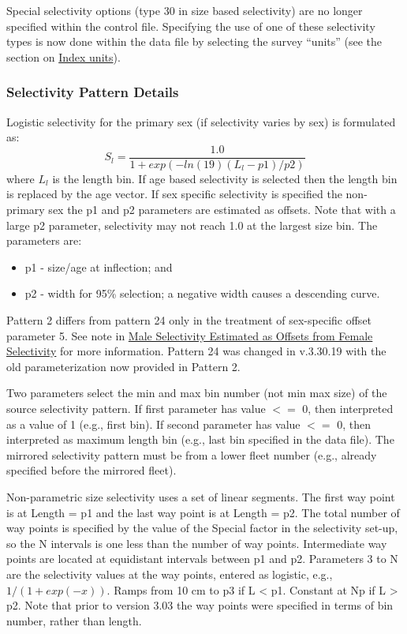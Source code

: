 Special selectivity options (type 30 in size based selectivity) are no longer specified within the control file. Specifying the use of one of these selectivity types is now done within the data file by selecting the survey ``units'' (see the section on \hyperlink{IndexUnits}{Index units}).

\subsubsection{Selectivity Pattern Details}
Logistic selectivity for the primary sex (if selectivity varies by sex) is formulated as:
	\begin{equation}
	S_l = \frac{1.0}{1+exp(-ln(19)(L_l - p1)/p2)}
	\end{equation}
where $L_l$ is the length bin. If age based selectivity is selected then the length bin is replaced by the age vector. If sex specific selectivity is specified the non-primary sex the p1 and p2 parameters are estimated as offsets. Note that with a large p2 parameter, selectivity may not reach 1.0 at the largest size bin. The parameters are:
\begin{itemize}
	\item p1 - size/age at inflection; and
	\item p2 - width for 95\% selection; a negative width causes a descending curve.
\end{itemize}

Pattern 2 differs from pattern 24 only in the treatment of sex-specific offset parameter 5. See note in \hyperlink{MaleSelectivityOffset}{Male Selectivity Estimated as Offsets from Female Selectivity} for more information. Pattern 24 was changed in v.3.30.19 with the old parameterization now provided in Pattern 2.

Two parameters select the min and max bin number (not min max size) of the source selectivity pattern. If first parameter has value $<=$ 0, then interpreted as a value of 1 (e.g., first bin). If second parameter has value $<=$ 0, then interpreted as maximum length bin (e.g., last bin specified in the data file). The mirrored selectivity pattern must be from a lower fleet number (e.g., already specified before the mirrored fleet).


Non-parametric size selectivity uses a set of linear segments. The first way point is at Length = p1 and the last way point is at Length = p2. The total number of way points is specified by the value of the Special factor in the selectivity set-up, so the N intervals is one less than the number of way points. Intermediate way points are located at equidistant intervals between p1 and p2. Parameters 3 to N are the selectivity values at the way points, entered as logistic, e.g., $1/(1+exp(-x))$. Ramps from 10 cm to p3 if L < p1. Constant at Np if L > p2. Note that prior to version 3.03 the way points were specified in terms of bin number, rather than length.


